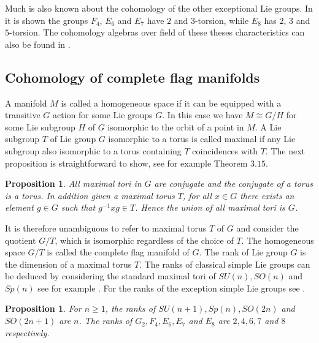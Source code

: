 \documentclass{article}
\theoremstyle{plain}
\newtheorem{prop}[thm]{Proposition}
\theoremstyle{definition}
\numberwithin{thm}{section}
\begin{document}
		Much is also known about the cohomology of the other exceptional Lie groups.
		In \cite[\S 7]{TLI&II} it is shown the groups $F_4$, $E_6$ and $E_7$ have $2$ and $3$-torsion, while $E_8$ has $2$, $3$ and $5$-torsion. 
		The cohomology algebras over field of these theses characteristics can also be found in \cite[\S 7]{TLI&II}.

	\subsection{Cohomology of complete flag manifolds}\label{sec:CohomCompFlag}

		A manifold $M$ is called a homogeneous space if it can be equipped with a transitive $G$ action for some Lie groups $G$.
		In this case we have $M \cong G/H$ for some Lie subgroup $H$ of $G$ isomorphic to the orbit of a point in $M$.
		A Lie subgroup $T$ of Lie group $G$ isomorphic to a torus is called maximal
		if any Lie subgroup also isomorphic to a torus containing $T$ coincidences with $T$.
		The next proposition is straightforward to show, see for example \cite[\S $5.3$]{TLI&II} Theorem $3.15$.
		
		\begin{prop}\label{prop:tori}
				All maximal tori in $G$ are conjugate and the conjugate of a torus is a torus.
				In addition given a maximal torus $T$, for all $x\in G$ there exists an element $g\in G$ such that $g^{-1}xg\in T$.
				Hence the union of all maximal tori is $G$.
		\end{prop}
		
		It is therefore unambiguous to refer to maximal torus $T$ of $G$ and consider the quotient $G/T$, which is isomorphic regardless of the choice of $T$.
		The homogeneous space $G/T$ is called the complete flag manifold of $G$.
		The rank of Lie group $G$ is the dimension of a maximal torus $T$.
		The ranks of classical simple Lie groups can be deduced by considering the standard maximal tori of $SU(n),SO(n)$ and $Sp(n)$
		see for example \cite[Chapter 7]{MatrixGroups}.
		For the ranks of the exception simple Lie groups see \cite{Exceptional}.
		
		\begin{prop}\label{prop:rank}
				For $n\geq 1$, the ranks of $SU(n+1),Sp(n),SO(2n)$ and $SO(2n+1)$ are $n$.
				The ranks of $G_2,F_4,E_6,E_7$ and $E_8$ are $2,4,6,7$ and $8$ respectively.
		\end{prop}
		
\end{document}
